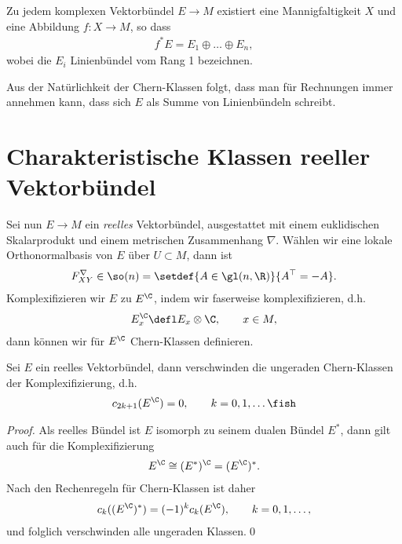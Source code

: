 \documentclass[%
	paper=a5,%
	fleqn,%
	DIV=18,%
	BCOR=0mm,
	fontsize=11pt,
	titlepage=false,%
	bibliography=totoc,
	DIV=18,%
	twoside=true,
	pdftitle=Riemannsche Geometrie,
	pdfauthor=Uwe Semmelmann,
	numbers=noendperiod]%
	{scrbook}
\begin{document}
\begin{prop}
Zu jedem komplexen Vektorbündel $E\to M$ existiert eine Mannigfaltigkeit $X$ und eine Abbildung $f: X\to M$, so dass
\begin{align*}
f^*E = E_{1}\oplus \ldots \oplus E_{n},
\end{align*}
wobei die $E_{i}$ Linienbündel vom Rang 1 bezeichnen.\fish
\end{prop}

Aus der Natürlichkeit der Chern-Klassen folgt, dass man f\"ur Rechnungen  immer annehmen kann, dass sich
$E$ als Summe von Linienb\"undeln schreibt.

\section{Charakteristische Klassen reeller Vektorbündel}

Sei nun $E\to M$ ein \textit{reelles} Vektorbündel, ausgestattet mit einem euklidischen Skalarprodukt und einem metrischen Zusammenhang $\nabla$. Wählen wir eine lokale Orthonormalbasis von $E$ über $U\subset M$, dann ist
\begin{align*}
F_{XY}^\nabla \in \so(n) = \setdef{A\in\gl(n,\R)}{A^\top = - A}.
\end{align*}
Komplexifizieren wir $E$ zu $E^\C$, indem wir faserweise komplexifizieren, d.h.
\begin{align*}
E_{x}^\C \defl E_{x}\otimes \C,\qquad x\in M, 
\end{align*}
dann können wir für $E^\C$ Chern-Klassen definieren.

\begin{lem}
Sei $E$ ein reelles Vektorbündel, dann verschwinden die ungeraden Chern-Klassen der Komplexifizierung, d.h.
\begin{align*}
c_{{2k+1}}(E^\C) = 0,\qquad k = 0,1,\ldots\fish
\end{align*}
\end{lem}
\begin{proof}
Als reelles Bündel ist $E$ isomorph zu seinem dualen Bündel $E^*$, dann gilt auch für die Komplexifizierung
\begin{align*}
E^\C \cong (E^*)^\C = (E^\C)^*.
\end{align*}
Nach den Rechenregeln für Chern-Klassen ist daher
\begin{align*}
c_{k}((E^\C)^*) = (-1)^kc_{k}(E^\C),\qquad k=0,1,\ldots,
\end{align*}
und folglich verschwinden alle ungeraden Klassen.\qed
\end{proof}
\end{document}
